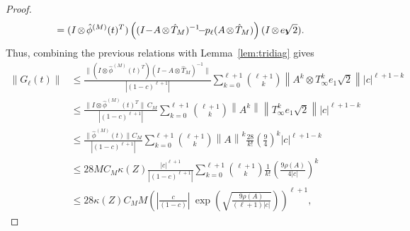 \documentclass[final,1p,times,number]{elsarticle}
\theoremstyle{plain}%
\begin{document}
\begin{proof}
\begin{align*}
&=     (I\hspace{-1pt}\otimes \hspace{-1pt}\hat{\phi}^{(M)}(t)^T)\left( (I\hspace{-2pt}-\hspace{-2pt}A\hspace{-1pt}\otimes\hspace{-1pt}\hat{T}_{M})^{-1}\hspace{-4pt}-\hspace{-3pt}p_\ell(A\hspace{-1pt}\otimes\hspace{-1pt}\hat{T}_{M}) \right) (I\hspace{-1pt}\otimes\hspace{-1pt} e_1\hspace{-5pt} \sqrt{2}).
\end{align*}
Thus, combining the previous relations with Lemma~\ref{lem:tridiag} gives
\begin{align*}
\left\|G_\ell(t)\right\|
&\leq  \frac{\| (I \otimes \hat\phi^{(M)}(t)^T) (I-A \otimes \hat{T}_{M})^{-1} \|}{|(1-c)^{\ell+1}|}  \sum_{k=0}^{\ell+1} \binom{\ell+1}{k} \left\| A^k\otimes {T}_{\infty}^k e_1 \sqrt{2}\right\| |c|^{\ell+1-k} \\
&\leq  \frac{\| I \otimes \hat\phi^{(M)}(t)^T\| \, C_M}{|(1-c)^{\ell+1}|}  \sum_{k=0}^{\ell+1} \binom{\ell+1}{k} \left\| A^k \right\| \left\| {T}_{\infty}^k  e_1 \sqrt{2} \right\| |c|^{\ell+1-k} \\
&\leq  \frac{\|\hat\phi^{(M)}(t) \|C_M}{|(1-c)^{\ell+1}|}  \sum_{k=0}^{\ell+1} \binom{\ell+1}{k} \left\| A \right\|^k  \frac{28}{k!} \left( \frac{9}{4} \right)^k |c|^{\ell+1-k} \\
&\leq 28 M C_M \kappa(Z) \frac{|c|^{\ell+1}}{|(1-c)^{\ell+1}|}  \sum_{k=0}^{\ell+1} \binom{\ell+1}{k}   \frac{1}{k!} \left( \frac{9 \rho(A)}{4 |c|} \right)^k \\
&\leq 28 \kappa(Z) C_M M \left( \left| \frac{c}{(1-c)} \right| \ \exp \left( \sqrt{\frac{9 \rho(A)}{(\ell + 1)|c|}} \right) \right)^{\ell + 1},
\end{align*}

\end{proof}
\end{document}

